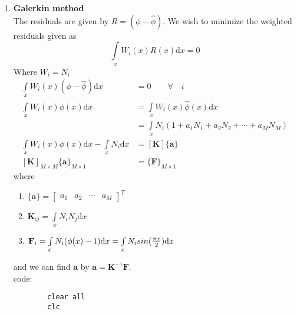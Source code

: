 \documentclass[11pt,paper=a4,answers]{exam}
\begin{document}
\begin{questions}
\begin{enumerate}[]
\begin{lstlisting}
            for k=1:size(collocPts, 1)
                for j=1:size(collocPts, 1)
                    Kvec(k,j) = subs(trialFns{i}{j}, x, collocPts(k));
                end
            end
            collocParams{i} = inv(Kvec)*collocFvec;
            phiHat{i} = 1 + trialFns{i}*collocParams{i};

            figure
            phiPlot = ezplot(phi, [0, 1]);
            set(phiPlot,'LineWidth',2); set(phiPlot,'color','g'); 
            hold on;
            phiHatPlot = ezplot(phiHat{i}, [0, 1]);
            set(phiHatPlot,'LineWidth',2); set(phiHatPlot,'color','r'); set(phiHatPlot,'LineStyle','--');
            set(get(gca,'XLabel'),'String','x');
            set(get(gca,'YLabel'),'String','$$\phi, \quad \hat{\phi}$$', 'Interpreter','LaTex');
            L = legend('$$\phi = 1 + sin({\pi x \over 2})$$', '$$\hat{\phi}$$', 'Location','southeast');
            set(L,'Interpreter','LaTex');
            title(['Plot showing actual and estimated function using point collocation for iteration ', num2str(i)]);
            hold off;
        end
    \end{lstlisting}

    \item \textbf{Galerkin method}\\
    The residuals are given by $R = (\phi - \hat{\phi})$. We wish to minimize the weighted residuals given as
    $$\int \limits_x W_i(x) R(x) \mathrm{d} x = 0$$
    Where $W_i = N_i$\\
    \begin{align}
        \int \limits_x W_i(x) (\phi - \hat{\phi}) \mathrm{d} x &= 0 \qquad \forall \quad i\nonumber \\
        \int \limits_x W_i(x) \phi(x) \mathrm{d} x &= \int \limits_x W_i(x) \hat{\phi}(x) \mathrm{d} x \nonumber \\
        &= \int \limits_x N_i (1 + a_1 N_1 + a_2 N_2 + \cdots + a_M N_M) \nonumber\\
        \int \limits_x W_i(x) \phi(x) \mathrm{d} x - \int \limits_x N_i \mathrm{d} x &= [\mathbf{K}]\{\mathbf{a}\} \nonumber \\
        [\mathbf{K}]_{M \times M} \{\mathbf{a}\}_{M \times 1} &= \{\mathbf{F}\}_{M \times 1}
    \end{align}
    where
    \begin{enumerate}[]
        \item $\{\mathbf{a}\} = \begin{bmatrix}
            a_1 & a_2 & \cdots & a_M
        \end{bmatrix}^T$
        \item $\mathbf{K}_{ij} = \int \limits_x N_i N_j \mathrm{d} x$
        \item $\mathbf{F}_i = \int \limits_x N_i(\phi(x) -1) \mathrm{d}x = \int \limits_x N_i sin({\pi x \over 2}) \mathrm{d}x$
    \end{enumerate}
    and we can find $\mathbf{a}$ by $\mathbf{a} = \mathbf{K} ^{-1} \mathbf{F}$.\\
    \newpage
    code:
    \begin{lstlisting}
        clear all
        clc


\end{lstlisting}
\end{enumerate}
\end{questions}
\end{document}
